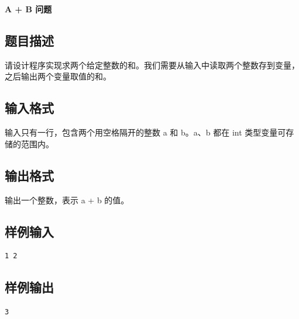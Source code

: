 \documentclass{article}
\newcommand{\problemname}[1]{\begin{center}\Large\bfseries #1\end{center}}
\begin{document}
\problemname{A + B 问题}

\subsection*{题目描述}
请设计程序实现求两个给定整数的和。我们需要从输入中读取两个整数存到变量，之后输出两个变量取值的和。

\subsection*{输入格式}
输入只有一行，包含两个用空格隔开的整数 a 和 b。a、b 都在 int 类型变量可存储的范围内。

\subsection*{输出格式}
输出一个整数，表示 a + b 的值。

\subsection*{样例输入}
\begin{verbatim}
1 2
\end{verbatim}

\subsection*{样例输出}
\begin{verbatim}
3
\end{verbatim}
\end{document}

